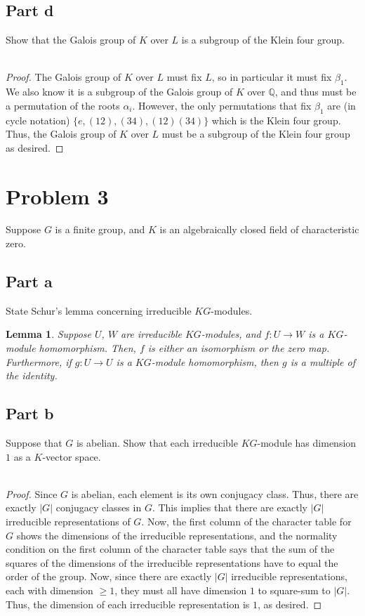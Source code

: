 \documentclass[12pt,reqno]{amsart}
\newcommand{\Q}{\mathbb{Q}}
\newtheorem*{lemma}{Lemma}
\begin{document}
\subsection*{Part d}
Show that the Galois group of $K$ over $L$ is a subgroup of the Klein four
group.
\\
\\
\begin{proof}
    The Galois group of $K$ over $L$ must fix $L$, so in particular it must fix
    $\beta_1$. We also know it is a subgroup of the Galois group of $K$ over
    $\Q$, and thus must be a permutation of the roots $\alpha_i$. However, the
    only permutations that fix $\beta_1$ are (in cycle notation)
    $\{e,(12),(34),(12)(34)\}$ which is the Klein four group. Thus, the Galois
    group of $K$ over $L$ must be a subgroup of the Klein four group as desired.
\end{proof}

\newpage

\section*{Problem 3}
Suppose $G$ is a finite group, and $K$ is an algebraically closed field of
characteristic zero.

\subsection*{Part a}
State Schur's lemma concerning irreducible $KG$-modules.
\begin{lemma}
    Suppose $U$, $W$ are irreducible $KG$-modules, and $f:U\to W$ is a
    $KG$-module homomorphism. Then, $f$ is either an isomorphism or the zero
    map. Furthermore, if $g:U\to U$ is a $KG$-module homomorphism, then $g$ is a
    multiple of the identity.
\end{lemma}

\subsection*{Part b}
Suppose that $G$ is abelian. Show that each irreducible $KG$-module has
dimension $1$ as a $K$-vector space.
\\
\\
\begin{proof}
    Since $G$ is abelian, each element is its own conjugacy class. Thus, there
    are exactly $|G|$ conjugacy classes in $G$. This implies that there are
    exactly $|G|$ irreducible representations of $G$. Now, the first column of
    the character table for $G$ shows the dimensions of the irreducible
    representations, and the normality condition on the first column of the
    character table says that the sum of the squares of the dimensions of the
    irreducible representations have to equal the order of the group. Now, since
    there are exactly $|G|$ irreducible representations, each with dimension
    $\geq 1$, they must all have dimension $1$ to square-sum to $|G|$. Thus, the
    dimension of each irreducible representation is $1$, as desired.
\end{proof}
\end{document}
